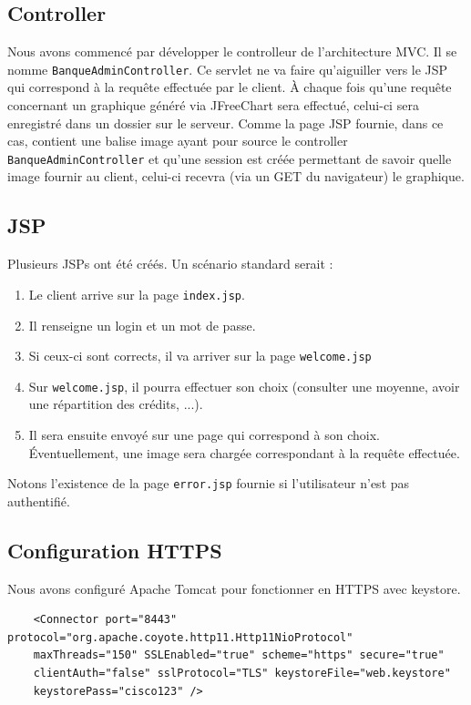 \documentclass[11pt,fleqn]{article}
\begin{document}
\subsection{Controller}
Nous avons commencé par développer le controlleur de l'architecture MVC. Il se nomme \texttt{BanqueAdminController}. Ce servlet ne va faire qu'aiguiller vers le JSP qui correspond à la requête effectuée par le client. À chaque fois qu'une requête concernant un graphique généré via JFreeChart sera effectué, celui-ci sera enregistré dans un dossier sur le serveur. Comme la page JSP fournie, dans ce cas, contient une balise image ayant pour source le controller \texttt{BanqueAdminController} et qu'une session est créée permettant de savoir quelle image fournir au client, celui-ci recevra (via un GET du navigateur) le graphique.
\subsection{JSP}
Plusieurs JSPs ont été créés. Un scénario standard serait :
\begin{enumerate}
	\item Le client arrive sur la page \texttt{index.jsp}.
	\item Il renseigne un login et un mot de passe.
	\item Si ceux-ci sont corrects, il va arriver sur la page \texttt{welcome.jsp}
	\item Sur \texttt{welcome.jsp}, il pourra effectuer son choix (consulter une moyenne, avoir une répartition des crédits, ...).
	\item Il sera ensuite envoyé sur une page qui correspond à son choix. Éventuellement, une image sera chargée correspondant à la requête effectuée. 
	\end{enumerate}
Notons l'existence de la page \texttt{error.jsp} fournie si l'utilisateur n'est pas authentifié.
\subsection{Configuration HTTPS}
Nous avons configuré Apache Tomcat pour fonctionner en HTTPS avec keystore.
\begin{lstlisting}
    <Connector port="8443" protocol="org.apache.coyote.http11.Http11NioProtocol"
    maxThreads="150" SSLEnabled="true" scheme="https" secure="true"
    clientAuth="false" sslProtocol="TLS" keystoreFile="web.keystore"
    keystorePass="cisco123" />
\end{lstlisting}
\end{document}
